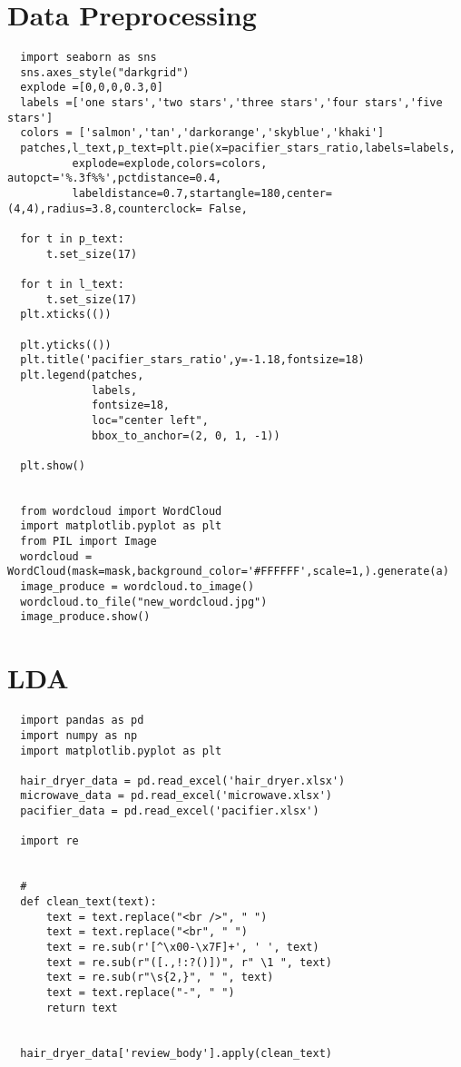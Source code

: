 \documentclass[12pt]{article}
\begin{document}
\begin{appendices}
          \section{Data Preprocessing}
          \par
          \begin{verbatim}
  import seaborn as sns
  sns.axes_style("darkgrid")
  explode =[0,0,0,0.3,0]
  labels =['one stars','two stars','three stars','four stars','five stars']
  colors = ['salmon','tan','darkorange','skyblue','khaki']
  patches,l_text,p_text=plt.pie(x=pacifier_stars_ratio,labels=labels,
          explode=explode,colors=colors, autopct='%.3f%%',pctdistance=0.4, 
          labeldistance=0.7,startangle=180,center=(4,4),radius=3.8,counterclock= False,

  for t in p_text:
      t.set_size(17)

  for t in l_text:
      t.set_size(17)
  plt.xticks(())

  plt.yticks(())
  plt.title('pacifier_stars_ratio',y=-1.18,fontsize=18)
  plt.legend(patches,
             labels,
             fontsize=18,
             loc="center left",
             bbox_to_anchor=(2, 0, 1, -1))

  plt.show()


  from wordcloud import WordCloud
  import matplotlib.pyplot as plt
  from PIL import Image
  wordcloud = WordCloud(mask=mask,background_color='#FFFFFF',scale=1,).generate(a)
  image_produce = wordcloud.to_image()
  wordcloud.to_file("new_wordcloud.jpg")
  image_produce.show()
  \end{verbatim}
  \section{LDA}
  \begin{verbatim}
  import pandas as pd
  import numpy as np
  import matplotlib.pyplot as plt

  hair_dryer_data = pd.read_excel('hair_dryer.xlsx')
  microwave_data = pd.read_excel('microwave.xlsx')
  pacifier_data = pd.read_excel('pacifier.xlsx')

  import re


  #
  def clean_text(text):
      text = text.replace("<br />", " ")
      text = text.replace("<br", " ")
      text = re.sub(r'[^\x00-\x7F]+', ' ', text)
      text = re.sub(r"([.,!:?()])", r" \1 ", text)
      text = re.sub(r"\s{2,}", " ", text)
      text = text.replace("-", " ")
      return text


  hair_dryer_data['review_body'].apply(clean_text)


\end{verbatim}
\end{appendices}
\end{document}
